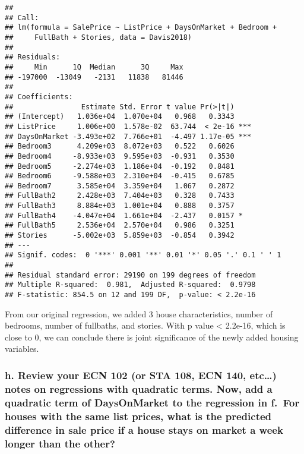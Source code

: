 \documentclass[
]{article}
\begin{document}
\begin{verbatim}
## 
## Call:
## lm(formula = SalePrice ~ ListPrice + DaysOnMarket + Bedroom + 
##     FullBath + Stories, data = Davis2018)
## 
## Residuals:
##     Min      1Q  Median      3Q     Max 
## -197000  -13049   -2131   11838   81446 
## 
## Coefficients:
##                Estimate Std. Error t value Pr(>|t|)    
## (Intercept)   1.036e+04  1.070e+04   0.968   0.3343    
## ListPrice     1.006e+00  1.578e-02  63.744  < 2e-16 ***
## DaysOnMarket -3.493e+02  7.766e+01  -4.497 1.17e-05 ***
## Bedroom3      4.209e+03  8.072e+03   0.522   0.6026    
## Bedroom4     -8.933e+03  9.595e+03  -0.931   0.3530    
## Bedroom5     -2.274e+03  1.186e+04  -0.192   0.8481    
## Bedroom6     -9.588e+03  2.310e+04  -0.415   0.6785    
## Bedroom7      3.585e+04  3.359e+04   1.067   0.2872    
## FullBath2     2.428e+03  7.404e+03   0.328   0.7433    
## FullBath3     8.884e+03  1.001e+04   0.888   0.3757    
## FullBath4    -4.047e+04  1.661e+04  -2.437   0.0157 *  
## FullBath5     2.536e+04  2.570e+04   0.986   0.3251    
## Stories      -5.002e+03  5.859e+03  -0.854   0.3942    
## ---
## Signif. codes:  0 '***' 0.001 '**' 0.01 '*' 0.05 '.' 0.1 ' ' 1
## 
## Residual standard error: 29190 on 199 degrees of freedom
## Multiple R-squared:  0.981,  Adjusted R-squared:  0.9798 
## F-statistic: 854.5 on 12 and 199 DF,  p-value: < 2.2e-16
\end{verbatim}

From our original regression, we added 3 house characteristics, number
of bedrooms, number of fullbaths, and stories. With p value \textless{}
2.2e-16, which is close to 0, we can conclude there is joint
significance of the newly added housing variables.

\newpage

\hypertarget{h.-review-your-ecn-102-or-sta-108-ecn-140-etc-notes-on-regressions-with-quadratic-terms.-now-add-a-quadratic-term-of-daysonmarket-to-the-regression-in-f.-for-houses-with-the-same-list-prices-what-is-the-predicted-difference-in-sale-price-if-a-house-stays-on-market-a-week-longer-than-the-other}{%
\subsubsection{h. Review your ECN 102 (or STA 108, ECN 140, etc\ldots{})
notes on regressions with quadratic terms. Now, add a quadratic term of
DaysOnMarket to the regression in f.~For houses with the same list
prices, what is the predicted difference in sale price if a house stays
on market a week longer than the
other?}\label{h.-review-your-ecn-102-or-sta-108-ecn-140-etc-notes-on-regressions-with-quadratic-terms.-now-add-a-quadratic-term-of-daysonmarket-to-the-regression-in-f.-for-houses-with-the-same-list-prices-what-is-the-predicted-difference-in-sale-price-if-a-house-stays-on-market-a-week-longer-than-the-other}}
\end{document}
